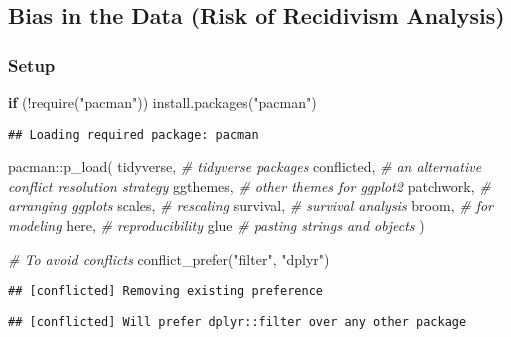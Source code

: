 \documentclass[
]{book}
\newenvironment{Shaded}{\begin{snugshade}}{\end{snugshade}}
\newcommand{\CommentTok}[1]{\textcolor[rgb]{0.56,0.35,0.01}{\textit{#1}}}
\newcommand{\ControlFlowTok}[1]{\textcolor[rgb]{0.13,0.29,0.53}{\textbf{#1}}}
\newcommand{\FunctionTok}[1]{\textcolor[rgb]{0.00,0.00,0.00}{#1}}
\newcommand{\NormalTok}[1]{#1}
\newcommand{\SpecialCharTok}[1]{\textcolor[rgb]{0.00,0.00,0.00}{#1}}
\newcommand{\StringTok}[1]{\textcolor[rgb]{0.31,0.60,0.02}{#1}}
\begin{document}
\hypertarget{bias-in-the-data-risk-of-recidivism-analysis}{%
\subsection{Bias in the Data (Risk of Recidivism Analysis)}\label{bias-in-the-data-risk-of-recidivism-analysis}}

\hypertarget{setup-7}{%
\subsubsection{Setup}\label{setup-7}}

\begin{Shaded}
\begin{Highlighting}[]
\ControlFlowTok{if}\NormalTok{ (}\SpecialCharTok{!}\FunctionTok{require}\NormalTok{(}\StringTok{"pacman"}\NormalTok{)) }\FunctionTok{install.packages}\NormalTok{(}\StringTok{"pacman"}\NormalTok{)}
\end{Highlighting}
\end{Shaded}

\begin{verbatim}
## Loading required package: pacman
\end{verbatim}

\begin{Shaded}
\begin{Highlighting}[]
\NormalTok{pacman}\SpecialCharTok{::}\FunctionTok{p\_load}\NormalTok{(}
\NormalTok{ tidyverse, }\CommentTok{\# tidyverse packages }
\NormalTok{ conflicted, }\CommentTok{\# an alternative conflict resolution strategy }
\NormalTok{ ggthemes, }\CommentTok{\# other themes for ggplot2 }
\NormalTok{ patchwork, }\CommentTok{\# arranging ggplots}
\NormalTok{ scales, }\CommentTok{\# rescaling }
\NormalTok{ survival, }\CommentTok{\# survival analysis}
\NormalTok{ broom, }\CommentTok{\# for modeling}
\NormalTok{ here, }\CommentTok{\# reproducibility }
\NormalTok{ glue }\CommentTok{\# pasting strings and objects }
\NormalTok{)}

\CommentTok{\# To avoid conflicts }
\FunctionTok{conflict\_prefer}\NormalTok{(}\StringTok{"filter"}\NormalTok{, }\StringTok{"dplyr"}\NormalTok{) }
\end{Highlighting}
\end{Shaded}

\begin{verbatim}
## [conflicted] Removing existing preference
\end{verbatim}

\begin{verbatim}
## [conflicted] Will prefer dplyr::filter over any other package
\end{verbatim}
\end{document}
